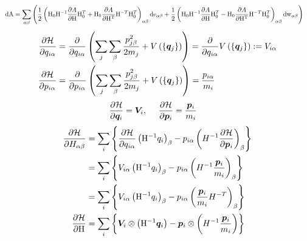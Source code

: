 \documentclass[11pt,a4paper,uplatex]{jsarticle}
\begin{document}
\begin{align}
    {\rm dA} &= \sum_{\alpha \beta} \left( 
    \frac{1}{2}\left({\rm H}_{0} {\rm H}^{-1} \frac{\partial A}{\partial {\rm H}} {\rm H}_{0}^{T} + {\rm H}_{0} \frac{\partial A}{\partial {\rm H^{T}}} {\rm H}^{-T}{\rm H}_{0}^{T}  \right)_{\alpha \beta} {\rm de}_{\alpha \beta}
     + \frac{1}{2}\left({\rm H}_{0} {\rm H}^{-1} \frac{\partial A}{\partial {\rm H}} {\rm H}_{0}^{T} - {\rm H}_{0} \frac{\partial A}{\partial {\rm H^{T}}} {\rm H}^{-T}{\rm H}_{0}^{T}  \right)_{\alpha \beta} {\rm dw}_{\alpha \beta} 
     \right)
\end{align}
\begin{align}
    \frac{\partial {\cal H}}{\partial q_{i \alpha}} &= \frac{\partial}{\partial q_{i \alpha}} \left( \sum_{j} \sum_{\beta}\frac{p_{j \beta}^{2}}{2m_{j}} + V \left(\{\bm{q}_{j}\}\right)\right) 
    = \frac{\partial}{\partial q_{i \alpha}} V \left(\{\bm{q}_{j}\}\right) 
    := V_{i \alpha} \\
    \frac{\partial {\cal H}}{\partial p_{i \alpha}} &= \frac{\partial}{\partial p_{i \alpha}} \left( \sum_{j} \sum_{\beta}\frac{p_{j \beta}^{2}}{2m_{j}} + V \left(\{\bm{q}_{j}\}\right)\right) 
    = \frac{p_{i \alpha}}{m_{i}}
\end{align}
\begin{align}
    \frac{\partial {\cal H}}{\partial \bm{q}_{i}} &= \bm{V}_{i} ,  \ \ \ \  
    \frac{\partial {\cal H}}{\partial \bm{p}_{i}} = \frac{\bm{p}_{i}}{m_{i}}
\end{align}
\begin{align}
    \frac{\partial {\cal H}}{\partial H_{\alpha \beta}} 
    &= \sum_{i} \left\{ \frac{\partial {\cal H}}{\partial q_{i \alpha}} \left({\rm H}^{-1} q_{i}\right)_{\beta}
    -  p_{i \alpha} \left( H^{-1} \frac{\partial {\cal H}}{\partial \bm{p}_{i}}  \right)_{\beta} \right\} \\
    &= \sum_{i} \left\{ V_{i \alpha} \left({\rm H}^{-1} q_{i}\right)_{\beta}
    -  p_{i \alpha} \left( H^{-1}\frac{\bm{p}_{i}}{m_{i}}  \right)_{\beta} \right\} \\
    &= \sum_{i} \left\{ V_{i \alpha} \left({\rm H}^{-1} q_{i}\right)_{\beta}
    -  p_{i \alpha} \left( \frac{\bm{p}_{i}}{m_{i}} H^{-T} \right)_{\beta} \right\}  \\
    \frac{\partial {\cal H}}{\partial {\rm H}} &= \sum_{i}\left\{ \bm{V}_{i} \otimes   \left({\rm H}^{-1} \bm{q}_{i}\right) 
    - \bm{p}_{i} \otimes \left( H^{-1}\frac{\bm{p}_{i}}{m_{i}}  \right) \right\}     
\end{align}
\end{document}
